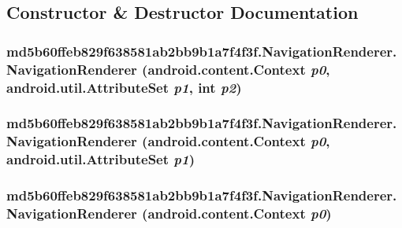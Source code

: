 \subsection{Constructor \& Destructor Documentation}
\hypertarget{classmd5b60ffeb829f638581ab2bb9b1a7f4f3f_1_1_navigation_renderer_4fd75f7ccc53756baaf34338ee29fa5c}{
\subsubsection[{NavigationRenderer}]{\setlength{\rightskip}{0pt plus 5cm}md5b60ffeb829f638581ab2bb9b1a7f4f3f.NavigationRenderer.NavigationRenderer (android.content.Context {\em p0}, \/  android.util.AttributeSet {\em p1}, \/  int {\em p2})}}
\label{classmd5b60ffeb829f638581ab2bb9b1a7f4f3f_1_1_navigation_renderer_4fd75f7ccc53756baaf34338ee29fa5c}


\hypertarget{classmd5b60ffeb829f638581ab2bb9b1a7f4f3f_1_1_navigation_renderer_e79f4d9083161297dbede7b341873a6c}{
\subsubsection[{NavigationRenderer}]{\setlength{\rightskip}{0pt plus 5cm}md5b60ffeb829f638581ab2bb9b1a7f4f3f.NavigationRenderer.NavigationRenderer (android.content.Context {\em p0}, \/  android.util.AttributeSet {\em p1})}}
\label{classmd5b60ffeb829f638581ab2bb9b1a7f4f3f_1_1_navigation_renderer_e79f4d9083161297dbede7b341873a6c}


\hypertarget{classmd5b60ffeb829f638581ab2bb9b1a7f4f3f_1_1_navigation_renderer_f6814c5338c0aaf0027c562d0344ddca}{
\subsubsection[{NavigationRenderer}]{\setlength{\rightskip}{0pt plus 5cm}md5b60ffeb829f638581ab2bb9b1a7f4f3f.NavigationRenderer.NavigationRenderer (android.content.Context {\em p0})}}
\label{classmd5b60ffeb829f638581ab2bb9b1a7f4f3f_1_1_navigation_renderer_f6814c5338c0aaf0027c562d0344ddca}




